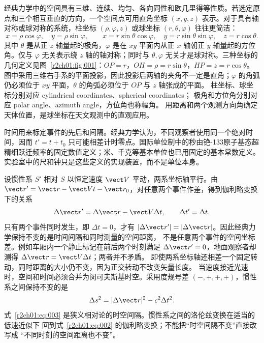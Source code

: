 经典力学中的空间具有三维、连续、均匀、各向同性和欧几里得等性质。若选定原点和三个相互垂直的方向，一个空间点可用直角坐标 $(x,y,z)$ 表示。对于具有轴对称或球对称的系统，柱坐标 $(\rho,\varphi,z)$ 或球坐标 $(r,\theta,\varphi)$ 往往更简洁：
\begin{equation}
  x=\rho\cos\varphi,\quad y=\rho\sin\varphi,
  \qquad
  x=r\sin\theta\cos\varphi,\quad
  y=r\sin\theta\sin\varphi,\quad
  z=r\cos\theta .
  \label{r2ch01:eq:001}
\end{equation}
其中 $\theta$ 是从正 $z$ 轴量起的极角，$\varphi$ 是在 $xy$ 平面内从正 $x$ 轴朝正 $y$ 轴量起的方位角。仅与 $\varphi$ 无关表示绕 $z$ 轴的轴对称；同时与 $\theta,\varphi$ 无关才是球对称。三种坐标的几何定义见图~\ref{r2ch01:fig:001}：$OP=r$，$OH=\rho=r\sin\theta$，$HP=z=r\cos\theta$。图中采用三维右手系的平面投影，因此投影后两轴的夹角不一定是直角；$\varphi$ 的角弧仍必须位于 $xy$ 平面，$\theta$ 的角弧必须位于 $OP$ 与 $z$ 轴张成的平面。
柱坐标、球坐标分别对应 cylindrical coordinates、spherical coordinates；
极角和方位角分别对应 polar angle、azimuth angle，方位角也称幅角。
用距离和两个观测方向角确定天体位置，是球坐标在天文观测中的直观应用。

\figCoordinates

时间用来标定事件的先后和间隔。经典力学认为，不同观察者使用同一个绝对时间，因而 $t'=t+t_0$ 只可能相差计时零点。国际单位制中的秒由铯-133原子基态超精细跃迁频率的固定数值定义；米、千克等基本单位也已用固定的基本常数定义。实验室中的尺和钟只是这些定义的实现装置，而不是单位本身。

设惯性系 $S'$ 相对 $S$ 以恒定速度 $\vect V$ 平动，两系坐标轴平行。由
$\vect r'=\vect r-\vect Vt-\vect r_0$，对任意两个事件作差，得到伽利略变换下的关系
\begin{equation}
  \Delta\vect r'=\Delta\vect r-\vect V\Delta t,
  \qquad \Delta t'=\Delta t.
  \label{r2ch01:eq:002}
\end{equation}
只有两个事件同时发生，即 $\Delta t=0$，才有
$|\Delta\vect r'|=|\Delta\vect r|$。因此经典力学保持不变的是时间间隔和同时测量的空间距离，
不是任意两个事件的空间坐标差。例如车厢内一个静止标记在前后两个时刻满足
$\Delta\vect r'=0$，地面观察者却测得 $\Delta\vect r=\vect V\Delta t$；两者并不矛盾。
即使两系坐标轴还相差一个固定转动，同时距离的大小仍不变，因为正交转动不改变矢量长度。
当速度接近光速时，空间和时间必须合并为闵可夫斯基时空。采用度规号差 $(-,+,+,+)$，惯性系之间保持不变的是
\begin{equation}
  \Delta s^2=\lvert\Delta\vect r\rvert^2-c^2\Delta t^2.
  \label{r2ch01:eq:003}
\end{equation}
式~\eqref{r2ch01:eq:003} 是狭义相对论的时空间隔。惯性系之间的洛伦兹变换在适当的低速近似下
回到式~\eqref{r2ch01:eq:002} 的伽利略变换；不能把“时空间隔不变”直接改写成
“不同时刻的空间距离也不变”。

